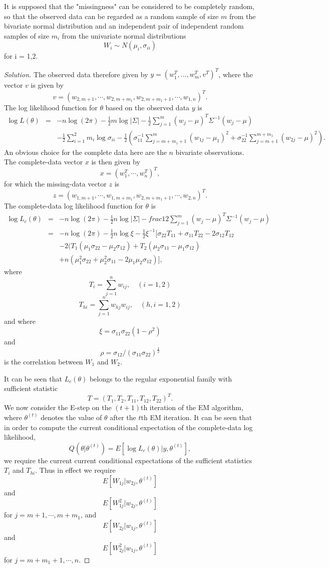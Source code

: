 \documentclass[11pt]{article}
\begin{document}
It is supposed that the "missingness" can be considered to be completely random, so that the observed data can be regarded as a random sample of size $m$ from the bivariate normal distribution and an independent pair of independent random samples of size $m_i$ from the univariate normal distributions
$$
W_i \sim N(\mu_i, \sigma_{ii})
$$
for i = 1,2. 
\begin{proof}[Solution]\let\qed\relax
The observed data therefore given by $y=(w_1^T, ... , w_m^T, v^T)^T$, where the vector $v$ is given by
$$
v = (w_{2,m+1}, \cdots, w_{2,m+m_1}, w_{2,m+m_1+1}, \cdots, w_{1,n})^T.
$$
The log likelihood function for $\theta$ based on the observed data $y$ is 
\begin{eqnarray*}
\log L(\theta) &=&-n\log(2\pi) - \frac{1}{2}m\log|\Sigma| - \frac{1}{2}\sum_{j=1}^{m}(w_j-\mu)^T\Sigma^{-1}(w_j-\mu) \\
&& -\frac{1}{2}\sum_{i=1}^{2}m_i\log\sigma_{ii} - \frac{1}{2}\left(\sigma_{11}^{-1} \sum_{j=m+m_1+1}^{m}(w_{1j}-\mu_1)^2+\sigma_{22}^{-1}\sum_{j=m+1}^{m+m_1}(w_{2j}-\mu)^2\right).
\end{eqnarray*}
An obvious choice for the complete data here are the $n$ bivariate observations. The complete-data vector $x$ is then given by
$$
x = (w_1^T, \cdots, w_n^T)^T, 
$$
for which the missing-data vector $z$ is
$$
z = (w_{1,m+1}, \cdots, w_{1,m+m_1}, w_{2,m+m_1+1},\cdots, w_{2,n})^T.
$$
The complete-data log likelihood function for $\theta$ is 
\begin{eqnarray*}
\log L_c(\theta) &=& -n\log(2\pi) - \frac{1}{2}n\log|\Sigma| -frac{1}{2}\sum_{j=1}^{m}(w_j-\mu)^T\Sigma^{-1}(w_j-\mu) \\
&=&  -n \log(2\pi) - \frac{1}{2}n\log\xi-\frac{1}{2}\xi^{-1}[\sigma_{22}T_{11} + \sigma_{11}T_{22} - 2\sigma_{12}T_{12} \\
&&  -2(T_1(\mu_1\sigma_{22}-\mu_2\sigma_{12})+T_2(\mu_2\sigma_{11}-\mu_1\sigma_{12}) \\
&& +n(\mu_1^2\sigma_{22}+\mu_2^2\sigma_{11}-2\mu_1\mu_2\sigma_{12})],
\end{eqnarray*}
where
$$
T_i = \sum_{j=1}^{n}w_{ij},\quad (i=1,2)
$$
$$
T_{hi} =  \sum_{j=1}^{n}w_{hj}w_{ij},\quad (h,i=1,2)
$$
and where 
$$
\xi = \sigma_{11}\sigma_{22}(1-\rho^2)
$$
and 
$$
\rho = \sigma_{12}/(\sigma_{11}\sigma_{22})^{\frac{1}{2}}
$$
is the correlation between $W_1$ and $W_2$.

It can be seen that $L_c(\theta)$ belongs to the regular exponential family with sufficient statistic
$$
T = (T_1, T_2, T_{11}, T_{12}, T_{22})^T.
$$
We now consider the E-step on the $(t+1)$th iteration of the EM algorithm, where $\theta^{(t)}$ denotes the value of $\theta$ after the $t$th EM iteration. It can be seen that in order to compute the current conditional expectation of the complete-data log likelihood, 
$$
Q(\theta|\theta^{(t)}) = E[\log L_c(\theta) | y, \theta^{(t)}],
$$
we require the current current conditional expectations of the sufficient statistics $T_i$ and $T_{hi}$. Thus in effect we require
$$
E[W_{1j} | w_{2j}, \theta^{(t)}]
$$
and 
$$
E[W^2_{1j} | w_{2j}, \theta^{(t)}]
$$
for $j=m+1, \cdots, m+m_1$, and 
$$
E[W_{2j} | w_{1j}, \theta^{(t)}]
$$
and 
$$
E[W^2_{2j} | w_{1j}, \theta^{(t)}]
$$
for $j=m+m_1+1, \cdots, n$.


\end{proof}
\end{document}
